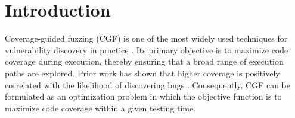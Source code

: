 \documentclass[lettersize,journal]{IEEEtran}
\begin{document}
\clearpage
\section{Introduction}

Coverage-guided fuzzing (CGF) is one of the most widely used techniques for vulnerability discovery in practice \cite{zhuFuzzingSurveyRoadmap2022,huangBalanceSeedScheduling2023,liDeepLearningCoverageguided2022,boehmeFuzzingChallengesReflections2021}. Its primary objective is to maximize code coverage during execution, thereby ensuring that a broad range of execution paths are explored. Prior work has shown that higher coverage is positively correlated with the likelihood of discovering bugs \cite{bohmeReliabilityCoveragebasedFuzzer2022}. Consequently, CGF can be formulated as an optimization problem in which the objective function is to maximize code coverage within a given testing time.
\end{document}
